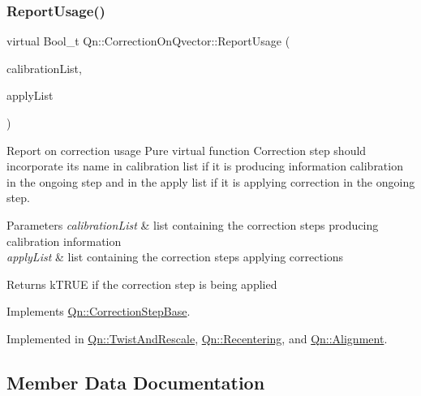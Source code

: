 \subsubsection{\texorpdfstring{Report\+Usage()}{ReportUsage()}}
{\footnotesize\ttfamily virtual Bool\+\_\+t Qn\+::\+Correction\+On\+Qvector\+::\+Report\+Usage (\begin{DoxyParamCaption}\item[{T\+List $\ast$}]{calibration\+List,  }\item[{T\+List $\ast$}]{apply\+List }\end{DoxyParamCaption})\hspace{0.3cm}{\ttfamily [pure virtual]}}

Report on correction usage Pure virtual function Correction step should incorporate its name in calibration list if it is producing information calibration in the ongoing step and in the apply list if it is applying correction in the ongoing step. 
\begin{DoxyParams}{Parameters}
{\em calibration\+List} & list containing the correction steps producing calibration information \\
\hline
{\em apply\+List} & list containing the correction steps applying corrections \\
\hline
\end{DoxyParams}
\begin{DoxyReturn}{Returns}
k\+T\+R\+UE if the correction step is being applied 
\end{DoxyReturn}


Implements \mbox{\hyperlink{classQn_1_1CorrectionStepBase_a235ae6623fbbe26601b95f7e76753bfd}{Qn\+::\+Correction\+Step\+Base}}.



Implemented in \mbox{\hyperlink{classQn_1_1TwistAndRescale_a2a6c985100656523b3d834a31d8f19a8}{Qn\+::\+Twist\+And\+Rescale}}, \mbox{\hyperlink{classQn_1_1Recentering_a06240f91a7656df95ac5aa55773b056a}{Qn\+::\+Recentering}}, and \mbox{\hyperlink{classQn_1_1Alignment_af8ef33833778e9af4bdb7b82f679c941}{Qn\+::\+Alignment}}.



\subsection{Member Data Documentation}
\mbox{\label{classQn_1_1CorrectionOnQvector_a6579bcaa376e434aa5399f8cdbbd60dd}} 
